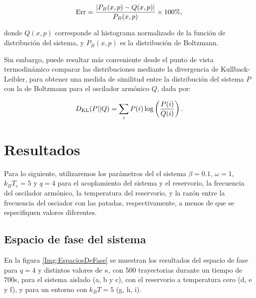 \documentclass[letterpaper,12pt,oneside]{book}
\begin{document}
	\begin{equation}\label{eq:ErrorTotal}
	{\rm Err} =  \frac{|P_B(x,p) - Q(x,p)|}{P_B(x,p)} \times 100 \%,
	\end{equation}
	
	\noindent donde $Q(x,p)$ corresponde al histograma normalizado de la función de distribución del sistema, y $P_B(x,p)$ es la distribución de Boltzmann.
	
	Sin embargo, puede resultar más conveniente desde el punto de vista termodinámico comparar las distribuciones mediante la divergencia de Kullback-Leibler, para obtener una medida de similitud entre la distribución del sistema $P$ con la de Boltzmann para el oscilador armónico $Q$, dada por:
	
	
	\begin{equation}
	D_{\rm KL}(P||Q) = \sum_i P(i)\log\left(\frac{P(i)}{Q(i)}\right).
	\end{equation}
	
\chapter{Resultados}

Para lo siguiente, utilizaremos los par\'ametros del el sistema $\beta=0.1$, $\omega=1$, $k_BT_e=5$ y $q=4$ para el acoplamiento del sistema y el reservorio, la frecuencia del oscilador arm\'onico, la temperatura del reservorio, y la raz\'on entre la frecuencia del osciador con las patadas, respectivamente, a menos de que se especifiquen valores diferentes. 

\section{Espacio de fase del sistema}

En la figura \ref{Img:EspaciosDeFase} se muestran los resultados del espacio de fase para $q=4$ y distintos valores de $\kappa$, con 500 trayectorias durante un tiempo de 700s, para el sistema aislado (a, b y c), con el reservorio a temperatura cero (d, e y f), y para un entorno con $k_BT = 5$ (g, h, i).
\end{document}
